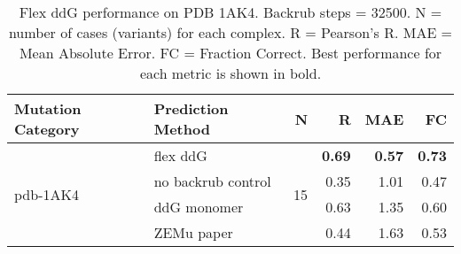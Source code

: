 \begin{table}
  \begin{tabular}{llrrrr}
\toprule
Mutation Category &   Prediction Method &   N &    R &  MAE &   FC \\
\midrule
 \multirow{ 4}{*}{pdb-1AK4} & flex ddG & \multirow{ 4}{*}{15} & \textbf{0.69} & \textbf{0.57} & \textbf{0.73}  \\
 & no backrub control & & 0.35 & 1.01 & 0.47  \\
 & ddG monomer & & 0.63 & 1.35 & 0.60  \\
 & ZEMu paper & & 0.44 & 1.63 & 0.53  \\
\bottomrule
\end{tabular}
  \caption[Flex ddG performance on PDB 1AK4]{
    Flex ddG performance on PDB 1AK4. Backrub steps = 32500. N = number of cases (variants) for each complex. R = Pearson's R. MAE = Mean Absolute Error. FC = Fraction Correct. Best performance for each metric is shown in bold.
  } \label{tab:table-pdb-1AK4}
\end{table}
